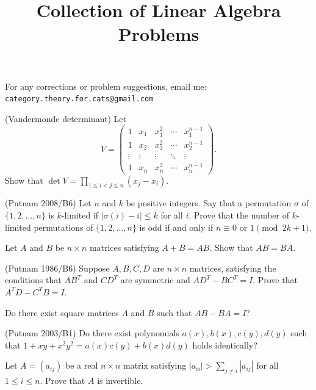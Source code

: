 \documentclass[12pt]{article}
\title{Collection of Linear Algebra Problems}
\author{}
\date{}
\begin{document}
\maketitle

\begin{tcolorbox}[
  colback=rosefill,
  colframe=roseline,
  boxrule=0.8pt,
  arc=3pt,
  left=8pt, right=8pt, top=6pt, bottom=6pt
]
\centering For any corrections or problem suggestions, email me: \texttt{category.theory.for.cats@gmail.com}
\end{tcolorbox}

\begin{problems}


\item (Vandermonde determinant) Let
\[
V=\begin{pmatrix}
1 & x_1 & x_1^2 & \cdots & x_1^{n-1}\\
1 & x_2 & x_2^2 & \cdots & x_2^{n-1}\\
\vdots & \vdots & \vdots & \ddots & \vdots\\
1 & x_n & x_n^2 & \cdots & x_n^{n-1}
\end{pmatrix}.
\]
Show that $\det V = \displaystyle\prod_{1\le i<j\le n}(x_j-x_i)$.

\item (Putnam 2008/B6) Let $n$ and $k$ be positive integers. Say that a permutation $\sigma$ of $\{1,2,\dots,n\}$ is $k$-limited if $|\sigma(i)-i|\le k$ for all $i$. Prove that the number of $k$-limited permutations of $\{1,2,\dots,n\}$ is odd if and only if $n\equiv 0$ or $1 \pmod{2k+1}$.

\item Let $A$ and $B$ be $n\times n$ matrices satisfying $A+B=AB$. Show that $AB=BA$.

\item (Putnam 1986/B6) Suppose $A,B,C,D$ are $n\times n$ matrices, satisfying the conditions that $AB^T$ and $CD^T$ are symmetric and $AD^T-BC^T=I$. Prove that $A^TD-C^TB=I$.

\item Do there exist square matrices $A$ and $B$ such that $AB-BA=I$?

\item (Putnam 2003/B1) Do there exist polynomials $a(x),b(x),c(y),d(y)$ such that $1+xy+x^2y^2 = a(x)c(y)+b(x)d(y)$ holds identically?

\item Let $A=(a_{ij})$ be a real $n\times n$ matrix satisfying $|a_{ii}| > \sum_{j\ne i}|a_{ij}|$ for all $1\le i\le n$. Prove that $A$ is invertible.


\end{problems}
\end{document}
